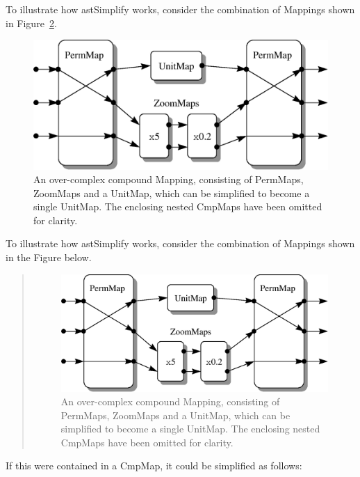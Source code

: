 \documentclass[twoside,11pt]{article}
\newenvironment{latexonly}{}{}
\newcommand{\htmlref}[2]{#1}
\begin{document}
\begin{latexonly}
   To illustrate how astSimplify works, consider the combination of
   Mappings shown in Figure~\ref{fig:simplifyexample}.
   \begin{figure}
   \begin{center}
   \includegraphics[scale=0.65]{sun211_figures/simpexamp.eps}
   \caption{An over-complex compound \htmlref{Mapping}{Mapping}, consisting of PermMaps,
   ZoomMaps and a \htmlref{UnitMap}{UnitMap}, which can be simplified to become a single
   UnitMap.  The enclosing nested CmpMaps have been omitted for clarity.}
   \label{fig:simplifyexample}
   \end{center}
   \end{figure}
\end{latexonly}
\begin{htmlonly}
   To illustrate how astSimplify works, consider the combination of
   Mappings shown in the Figure below.
   \begin{quote}
   \begin{figure}
   \label{fig:simplifyexample}
   \includegraphics[scale=1.1]{sun211_figures/simpexamp.eps}
   \caption{An over-complex compound Mapping, consisting of PermMaps,
   ZoomMaps and a UnitMap, which can be simplified to become a single
   UnitMap.  The enclosing nested CmpMaps have been omitted for clarity.}
   \end{figure}
   \end{quote}
\end{htmlonly}
If this were contained in a CmpMap, it could be simplified as follows:
\end{document}
